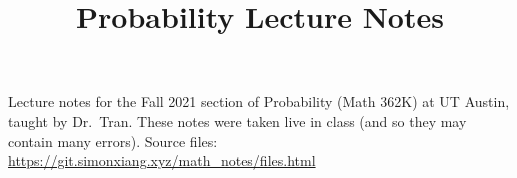 \documentclass[fontsize=9pt]{article}
\title{Probability Lecture Notes}
\date{}
\begin{document}
\maketitle
Lecture notes for the Fall 2021 section of Probability (Math 362K) at UT Austin, taught by Dr.\ Tran. These notes were taken live in class (and so they may contain many errors). Source files: \url{https://git.simonxiang.xyz/math_notes/files.html}

\tableofcontents
\newpage
    
    
\end{document}
